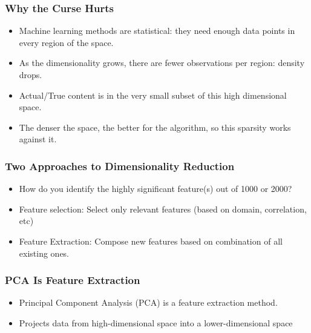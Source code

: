 \begin{frame}[fragile]\frametitle{Why the Curse Hurts}
\begin{itemize}
 \item Machine learning methods are statistical: they need enough data points in every region of the space.
 \item As the dimensionality grows, there are fewer observations per region: density drops.
 \item Actual/True content is in the very small subset of this high dimensional space.
 \item The denser the space, the better for the algorithm, so this sparsity works against it.
\end{itemize}
\end{frame}



\begin{frame}[fragile]\frametitle{Two Approaches to Dimensionality Reduction}
\begin{itemize}
\item  How do you identify the highly significant feature(s) out of 1000 or 2000?
\item Feature selection: Select only relevant features (based on domain, correlation, etc)
\item Feature Extraction: Compose new features based on combination of all existing ones.
\end{itemize}
\end{frame}


\begin{frame}[fragile]\frametitle{PCA Is Feature Extraction}
\begin{itemize}
\item Principal Component Analysis (PCA) is a feature extraction method.
\item Projects data from high-dimensional space into a lower-dimensional space
\end{itemize}
\end{frame}



